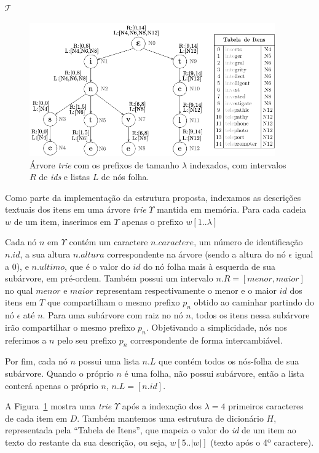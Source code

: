 $\mathcal{T}$
 
 \begin{figure} [ht]
    \centering
    \includegraphics[width=0.94\textwidth]{figures/index-structure.png}
    \caption{Árvore \textit{trie} com os prefixos de tamanho $\lambda$ indexados, com intervalos $R$ de \textit{ids} e listas $L$ de nós folha.}
    \label{fig:index_structure}
\end{figure}

 
Como parte da implementação da estrutura proposta, indexamos as descrições textuais dos itens em uma árvore \textit{trie} $\Upsilon$ mantida em memória. Para cada cadeia $w$ de um item, inserimos em $\Upsilon$ apenas o prefixo $w[1..\lambda]$ 

Cada nó $n$ em $\Upsilon$ contém um caractere $n.caractere$, um número de identificação $n.id$, a sua altura $n.altura$ correspondente na árvore (sendo a altura do nó $\epsilon$ igual a 0), e $n.ultimo$, que é o valor do $id$ do nó folha mais à esquerda de sua subárvore, em pré-ordem. Também possui um intervalo $n.R = [menor, maior]$ no qual $menor$ e $maior$ representam respectivamente o menor e o maior $id$ dos itens em $T$ que compartilham o mesmo prefixo $p_{n}$ obtido ao caminhar partindo do nó $\epsilon$ até $n$. Para uma subárvore com raiz no nó $n$, todos os itens nessa subárvore irão compartilhar o mesmo prefixo $p_{n}$. Objetivando a simplicidade, nós nos referimos a $n$ pelo seu prefixo $p_{n}$ correspondente de forma intercambiável. 

Por fim, cada nó $n$ possui uma lista $n.L$ que contém todos os nós-folha de sua subárvore. Quando o próprio $n$ é uma folha, não possui subárvore, então a lista conterá apenas o próprio $n$, $n.L = [n.id]$.

A Figura~\ref{fig:index_structure} mostra uma \textit{trie} $\Upsilon$ após a indexação dos $\lambda = 4$ primeiros caracteres de cada item em $D$. Também mantemos uma estrutura de dicionário $H$, representada pela ``Tabela de Itens'', que mapeia o valor do \textit{id} de um item ao texto do restante da sua descrição, ou seja, $w[5..|w|]$ (texto após o 4º caractere).

